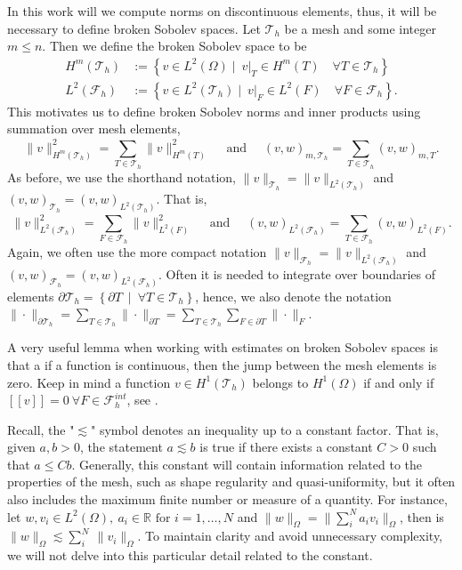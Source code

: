 \documentclass[11pt]{article}
\theoremstyle{remark}
\newcommand{\jump}[1]{\left[\!\left[ #1 \right]\!\right]}
\renewcommand{\le}{\leqslant}
\numberwithin{equation}{section}
\begin{document}
In this work will we compute norms on discontinuous elements, thus, it will be necessary to define broken Sobolev spaces.
Let $\mathcal{T}_{h} $ be a mesh and some integer $m\le n$. Then we define the broken Sobolev space to be \[
    \begin{split}
H^{m}( \mathcal{T}_{h} ) & := \left\{ v \in L^2( \Omega )  \mid \ v|_{T} \in H^{m}( T) \quad     \forall T \in  \mathcal{T}_{h} \right\}\\
        L^{2}( \mathcal{F}_{h} ) &:= \left\{ v \in L^2( \mathcal{T}_{h}  )  \mid   \ v|_{F} \in L^{2}( F)  \quad  \forall F \in  \mathcal{F}_{h}   \right\}.
    \end{split}
\]
This motivates us to define broken Sobolev norms and inner products using summation over mesh elements,
\[
 \| v \|_{H^{m}( \mathcal{T}_{h} ) }^{2} = \sum_{T \in  \mathcal{T}_{h} }^{} \| v  \|_{ H^{m}( T ) }^{2  } \quad \text{ and } \quad
 (v ,w )_{ m, \mathcal{T} _{h} }^{} = \sum_{T \in \mathcal{T} _{h}}^{} (v ,w )_{ m,T }^{  } .
\]
As before, we use the shorthand notation,  $\| v \|_{\mathcal{T}_{h}} =  \| v \|_{L^{2}( \mathcal{T}_{h} ) }$ and  $(v ,w )_{ \mathcal{T}_{h} }^{} = (v ,w )_{L^2( \mathcal{T}_{h} ) }^{} $.
That is,
\[
 \| v \|_{L^{2}( \mathcal{F}_{h} ) }^{2} = \sum_{F \in  \mathcal{F}_{h} }^{} \| v  \|_{ L^{2}( F ) }^{2  } \quad \text{ and } \quad
 (v ,w )_{L^{2}( \mathcal{F}_{h} ) }^{} = \sum_{T \in \mathcal{F} _{h}}^{} (v ,w )_{ L^{2}( F ) }^{  } .
\]
Again, we often use the more compact notation $\| v \|_{\mathcal{F}_{h}} =  \| v \|_{L^{2}( \mathcal{F}_{h} ) }$ and  $(v ,w )_{ \mathcal{F}_{h} }^{} = (v ,w )_{L^2( \mathcal{F}_{h} ) }^{} $.
Often  it is needed to integrate over boundaries of elements $\partial \mathcal{T} _{h}  = \left\{ \partial T \  \mid \  \forall T \in \mathcal{T}_{h} \right\}  $, hence, we also denote the notation $\| \cdot  \|_{ \partial \mathcal{T} _{h} }^{  } = \sum_{T \in \mathcal{T} _{h} }^{} \| \cdot  \|_{ \partial T }^{  }
=\sum_{T \in \mathcal{T} _{h} }^{} \sum_{F \in \partial T}^{}  \| \cdot  \|_{ F }^{  }  $.

A very useful lemma when working with estimates on broken Sobolev spaces is that a if a function is continuous, then the jump between the mesh elements is zero. Keep in mind a function $ v \in  H^{1}( \mathcal{T}_{h} ) $ belongs to $ H^{1}( \Omega )  $ if and only
if $ \jump{ v }   = 0 \  \forall F \in \mathcal{F}^{int}_{h}$, see \cite[Lemma 1.23]{pietro2012}.

Recall, the "$\lesssim$" symbol denotes an inequality up to a constant factor. That is, given $a,b >0 $, the statement $a \lesssim b$ is true if there exists a constant $C>0$ such that $a \leq Cb$. Generally, this constant will contain
information related to the properties of the mesh, such as shape regularity and quasi-uniformity, but it often also includes the maximum finite number or measure of a quantity. For instance, let  $w , v_{i} \in L^{2}( \Omega ), \ a_{i} \in \mathbb{R}  \text{ for } i =
1,\ldots,N  $   and  $ \| w \|_{\Omega   }^{  }  =  \| \sum_{i}^{N} a_{i}  v_{i} \|_{\Omega   }^{  } $, then is $ \| w \|_{\Omega   }^{  }
\lesssim \sum_{i}^{N}  \  \| v_{i} \|_{\Omega   }^{  }  $. To maintain clarity and avoid unnecessary complexity, we will not delve into this particular detail related to the constant.
\end{document}
